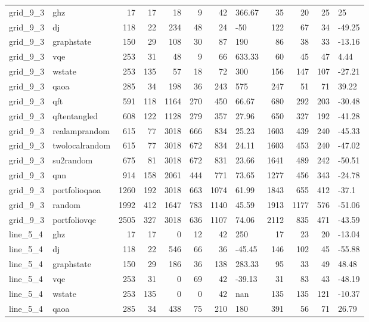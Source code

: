 \begin{longtable}{llrrrrrlrrrl}
grid\_9\_3 & ghz & 17 & 17 & 18 & 9 & 42 & 366.67 & 35 & 20 & 25 & 25 \\
grid\_9\_3 & dj & 118 & 22 & 234 & 48 & 24 & -50 & 122 & 67 & 34 & -49.25 \\
grid\_9\_3 & graphstate & 150 & 29 & 108 & 30 & 87 & 190 & 86 & 38 & 33 & -13.16 \\
grid\_9\_3 & vqe & 253 & 31 & 48 & 9 & 66 & 633.33 & 60 & 45 & 47 & 4.44 \\
grid\_9\_3 & wstate & 253 & 135 & 57 & 18 & 72 & 300 & 156 & 147 & 107 & -27.21 \\
grid\_9\_3 & qaoa & 285 & 34 & 198 & 36 & 243 & 575 & 247 & 51 & 71 & 39.22 \\
grid\_9\_3 & qft & 591 & 118 & 1164 & 270 & 450 & 66.67 & 680 & 292 & 203 & -30.48 \\
grid\_9\_3 & qftentangled & 608 & 122 & 1128 & 279 & 357 & 27.96 & 650 & 327 & 192 & -41.28 \\
grid\_9\_3 & realamprandom & 615 & 77 & 3018 & 666 & 834 & 25.23 & 1603 & 439 & 240 & -45.33 \\
grid\_9\_3 & twolocalrandom & 615 & 77 & 3018 & 672 & 834 & 24.11 & 1603 & 453 & 240 & -47.02 \\
grid\_9\_3 & su2random & 675 & 81 & 3018 & 672 & 831 & 23.66 & 1641 & 489 & 242 & -50.51 \\
grid\_9\_3 & qnn & 914 & 158 & 2061 & 444 & 771 & 73.65 & 1277 & 456 & 343 & -24.78 \\
grid\_9\_3 & portfolioqaoa & 1260 & 192 & 3018 & 663 & 1074 & 61.99 & 1843 & 655 & 412 & -37.1 \\
grid\_9\_3 & random & 1992 & 412 & 1647 & 783 & 1140 & 45.59 & 1913 & 1177 & 576 & -51.06 \\
grid\_9\_3 & portfoliovqe & 2505 & 327 & 3018 & 636 & 1107 & 74.06 & 2112 & 835 & 471 & -43.59 \\
line\_5\_4 & ghz & 17 & 17 & 0 & 12 & 42 & 250 & 17 & 23 & 20 & -13.04 \\
line\_5\_4 & dj & 118 & 22 & 546 & 66 & 36 & -45.45 & 146 & 102 & 45 & -55.88 \\
line\_5\_4 & graphstate & 150 & 29 & 186 & 36 & 138 & 283.33 & 95 & 33 & 49 & 48.48 \\
line\_5\_4 & vqe & 253 & 31 & 0 & 69 & 42 & -39.13 & 31 & 83 & 43 & -48.19 \\
line\_5\_4 & wstate & 253 & 135 & 0 & 0 & 42 & nan & 135 & 135 & 121 & -10.37 \\
line\_5\_4 & qaoa & 285 & 34 & 438 & 75 & 210 & 180 & 391 & 56 & 71 & 26.79 \\

\end{longtable}
